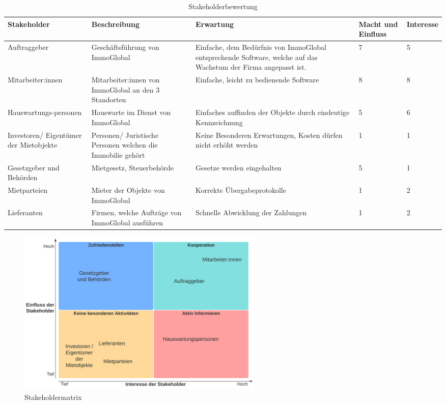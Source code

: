 \begin{table}[H]
  \centering
  \settowidth{}
  \setlength\extrarowheight{2pt}
  \begin{tabulary}{1.0\textwidth}{|L|L|L|a|z|}
    \hline
    \textbf{Stakeholder} & 
    \textbf{Beschreibung} & 
    \textbf{Erwartung}& 
    \textbf{Macht und Einfluss} & 
    \textbf{Interesse}\\
    \hline
    Auftraggeber & 
    Geschäftsführung von ImmoGlobal& 
    Einfache, dem Bedürfnis von ImmoGlobal entsprechende Software, welche auf das Wachstum der Firma angepasst ist. &
    7 &
    5 \\ 
    \hline
    Mitarbeiter:innen & 
    Mitarbeiter:innen von ImmoGlobal an den 3 Standorten & 
    Einfache, leicht zu bedienende Software&
    8 &
    8 \\
    \hline
    Hauswartungs-personen & 
    Hauswarte im Dienst von ImmoGlobal &
    Einfaches auffinden der Objekte durch eindeutige Kennzeichnung &
    5 &
    6 \\
    \hline
    Investoren/ Eigentümer der Mietobjekte & 
    Personen/ Juristische Personen welchen die Immobilie gehört &
    Keine Besonderen Erwartungen, Kosten dürfen nicht erhöht werden &
    1 &
    1 \\
    \hline
    Gesetzgeber und Behörden &
    Mietgesetz, Steuerbehörde &
    Gesetze werden eingehalten &
    5 &
    1 \\
    \hline
    Mietparteien & 
    Mieter der Objekte von ImmoGlobal &
    Korrekte Übergabeprotokolle &
    1 &
    2 \\
    \hline
    Lieferanten & 
    Firmen, welche Aufträge von ImmoGlobal ausführen &
    Schnelle Abwicklung der Zahlungen &
    1 &
    2 \\
    \hline
  \end{tabulary}
  \caption{Stakeholderbewertung}
  \label{Stakeholderbewertung}
\end{table}

\begin{figure}[H]
  \begin{center}
      \includegraphics[width=0.58\textwidth]{content/images/Stakeholdematrix.png}
      \caption{Stakeholdermatrix}
      \label{fig:Stakeholdermatrix}
    \end{center}
\end{figure}


